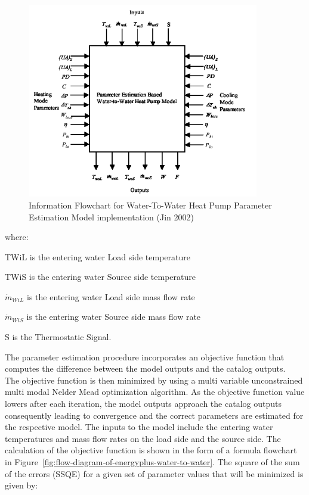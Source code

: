 \begin{figure}[hbtp] %
\centering
\includegraphics[width=0.9\textwidth, height=0.9\textheight, keepaspectratio=true]{media/image5306.png}
\caption{Information Flowchart for Water-To-Water Heat Pump Parameter Estimation Model implementation (Jin 2002) \protect \label{fig:information-flowchart-for-water-to-water-heat}}
\end{figure}

where:

TWiL is the entering water Load side temperature

TWiS is the entering water Source side temperature

\({\dot{m}_{WiL}}\) is the entering water Load side mass flow rate

\({\dot{m}_{WiS}}\) is the entering water Source side mass flow rate

S is the Thermostatic Signal.

The parameter estimation procedure incorporates an objective function that computes the difference between the model outputs and the catalog outputs.~ The objective function is then minimized by using a multi variable unconstrained multi modal Nelder Mead optimization algorithm. As the objective function value lowers after each iteration, the model outputs approach the catalog outputs consequently leading to convergence and the correct parameters are estimated for the respective model. The inputs to the model include the entering water temperatures and mass flow rates on the load side and the source side. The calculation of the objective function is shown in the form of a formula flowchart in Figure~\ref{fig:flow-diagram-of-energyplus-water-to-water}. The square of the sum of the errors (SSQE) for a given set of parameter values that will be minimized is given by:

